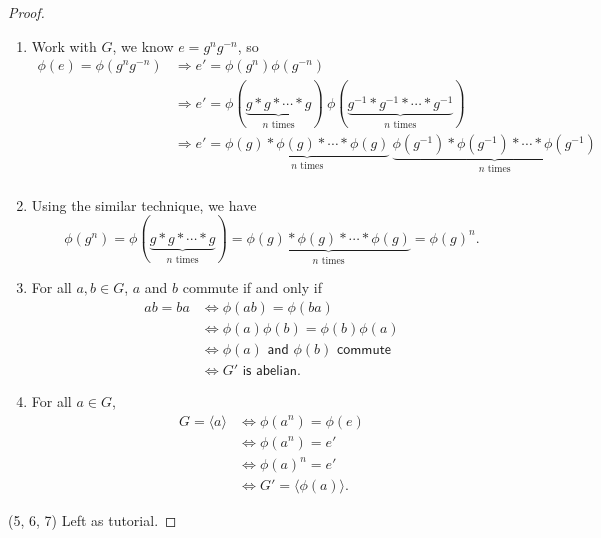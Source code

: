 \begin{proof}
    \begin{enumerate}
        \item Work with $G$, we know $e = g^n g^{-n}$, so 
        \begin{align*}
            \phi(e) = \phi(g^ng^{-n})&\Rightarrow e' = \phi(g^n) \phi(g^{-n})\\
            &\Rightarrow e' = \phi(\underbrace{g * g * \cdots * g}_{n \text{ times}})\> \phi(\underbrace{g^{-1} * g^{-1} * \cdots * g^{-1}}_{n \text{ times}})\\
            &\Rightarrow e' = \underbrace{\phi(g) * \phi(g) * \cdots * \phi(g)}_{n \text{ times}}\> \underbrace{\phi(g^{-1}) * \phi(g^{-1}) * \cdots * \phi(g^{-1})}_{n \text{ times}}\\
        \end{align*}

        \item Using the similar technique, we have 
            \[
                \phi(g^n) = \phi(\underbrace{g * g * \cdots * g}_{n \text{ times}}) = \underbrace{\phi(g) * \phi(g) * \cdots * \phi(g)}_{n \text{ times}} = \phi(g)^n.
            \]
        
        \item For all $a,b \in G$, $a$ and $b$ commute if and only if 
            \begin{align*}
                ab = ba &\Longleftrightarrow \phi(ab) = \phi(ba) \\
                &\Longleftrightarrow \phi(a) \phi(b) = \phi(b) \phi(a) \\
                &\Longleftrightarrow \phi(a) \textsf{ and } \phi(b) \textsf{ commute}\\
                &\Longleftrightarrow G' \textsf{ is abelian}.
            \end{align*}
        
        \item For all $a \in G$, 
            \begin{align*}
                G = \langle a \rangle &\Longleftrightarrow \phi(a^n) = \phi(e) \\
                &\Longleftrightarrow \phi(a^n) = e' \\
                &\Longleftrightarrow \phi(a)^n = e'\\
                &\Longleftrightarrow G' = \langle \phi(a) \rangle.
            \end{align*}
    \end{enumerate}

    (5, 6, 7) Left as tutorial.
\end{proof}

